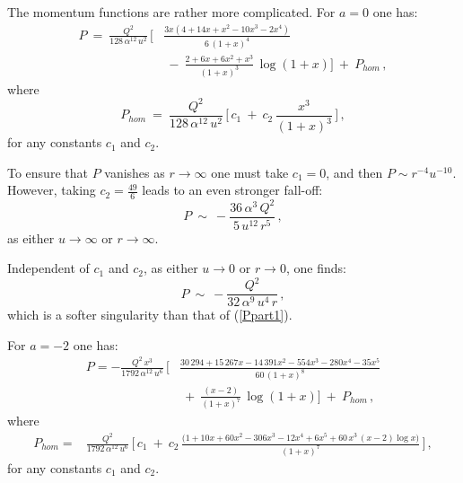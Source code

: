\documentclass[11pt]{article}
\numberwithin{equation}{section}
\begin{document}
The momentum functions are rather more complicated.  For $a=0$ one has:
%
\begin{equation}
\begin{aligned}
P  ~=~ \frac{Q^2}{128\,\alpha^{12}\, u^2} \,\bigg[& \frac{3 x( 4 + 14 x + x^2 - 10 x^3 - 2 x^4 ) }{ 6\,(1+x)^4 }\\
&~-~ \frac{2 +6 x +6 x^2 + x^3  }{ (1+x)^3}\, \log (1+x) \bigg] ~+~ P_{hom} \,,
\end{aligned}
\label{Ppart3}
\end{equation}
%
where 
%
\begin{equation}
P_{hom}   ~=~ \frac{Q^2}{128\,\alpha^{12}\, u^2} \,\bigg[\, c_1 ~+~ c_2 \, \frac{ x^3}{(1+x)^3 }  \,  \bigg]   \,,
\label{Ppart3a}
\end{equation}
%
for any constants $c_1$ and $c_2$.

To ensure that $P$ vanishes as $r \to \infty$ one must take $c_1=0$, and then $P \sim r^{-4} u^{-10}$.  However, taking $c_2 = \frac{49}{6}$ leads to an even stronger fall-off:  
%
\begin{equation}
P  ~\sim~ -\frac{36\,\alpha^{3}\, Q^2}{5\, u^{12}\, r^5}  \,,
\label{Pasymp01}
\end{equation}
%
as either $u \to \infty$ or $r \to \infty$.

 Independent of  $c_1$ and  $c_2$, as either $u \to 0 $ or $r \to 0$,  one finds:
%
\begin{equation}
P  ~\sim~ -\frac{Q^2}{32\,\alpha^{9}\, u^4\, r}  \,,
\label{Psrc0}
\end{equation}
%
which is a softer singularity than that of (\ref{Ppart1}).


For $a=-2$ one has:
%
\begin{equation}
\begin{aligned}
P  =- \frac{Q^2\, x^3}{1792\, \alpha^{12}\, u^6} \,\bigg[& \frac{30\,294 +15\,267 x -14\, 391x^2 - 554 x^3 - 280 x^4 - 35  x^5 }{ 60\,(1+x)^8 }\\
& ~+~ \frac{(x-2)   }{  (1+x)^7}\, \log (1+x ) \bigg] ~+~ P_{hom} \,,
\end{aligned}
\label{Ppart-2}
\end{equation}
%
where 
%
\begin{equation}
\begin{aligned}
P_{hom}   =   & \frac{Q^2}{1792\,\alpha^{12}\, u^6} \,\bigg[\,  c_1 ~+~ c_2 \, \frac{\big(1 +10 x   +60 x^2 - 306 x^3 - 12 x^4 + 6  x^5 + 60\,x^3 \, (x-2) \log x  \big)}{  (1+x)^7}  \,  \bigg]   \,,
\end{aligned}
\label{Phom-2}
\end{equation}
%
for any constants $c_1$ and $c_2$.  
\end{document}
